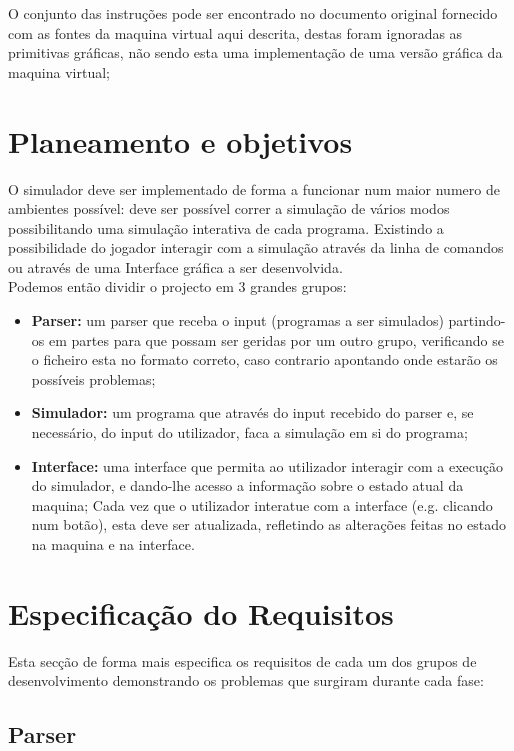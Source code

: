 \documentclass{report}
\begin{document}
\quad O conjunto das instruções pode ser encontrado no documento original fornecido com as fontes da maquina virtual aqui descrita,
destas foram ignoradas as primitivas gráficas, não sendo esta uma implementação de uma versão gráfica da maquina virtual;

\section{Planeamento e objetivos}
\quad O simulador deve ser implementado de forma a funcionar num maior numero de ambientes possível:
deve ser possível correr a simulação de vários modos possibilitando uma simulação interativa de cada programa.
Existindo a possibilidade do jogador interagir com a simulação através da linha de comandos ou através de uma Interface
gráfica a ser desenvolvida.\\
\null\quad Podemos então dividir o projecto em 3 grandes grupos:
\begin{itemize}
	\item \textbf{Parser:} um parser que receba o input
	(programas a ser simulados) partindo-os em partes para que possam ser geridas por um outro grupo,
	verificando se o ficheiro esta no formato correto, caso contrario apontando onde estarão os possíveis problemas;

	\item \textbf{Simulador:} um programa que através do input recebido do parser e, se necessário, do input do utilizador,
	faca a simulação em si do programa;

	\item \textbf{Interface:} uma interface que permita ao utilizador interagir com a execução do simulador,
	e dando-lhe acesso a informação sobre o estado atual da maquina;
	Cada vez que o utilizador interatue com a interface (e.g. clicando num botão), esta deve ser atualizada,
	refletindo as alterações feitas no estado na maquina e na interface.
\end{itemize}

\section{Especificação do Requisitos}
\quad Esta secção de forma mais especifica os requisitos de cada um dos grupos de desenvolvimento demonstrando os problemas que
surgiram durante cada fase:

\subsection{Parser}
\end{document}
